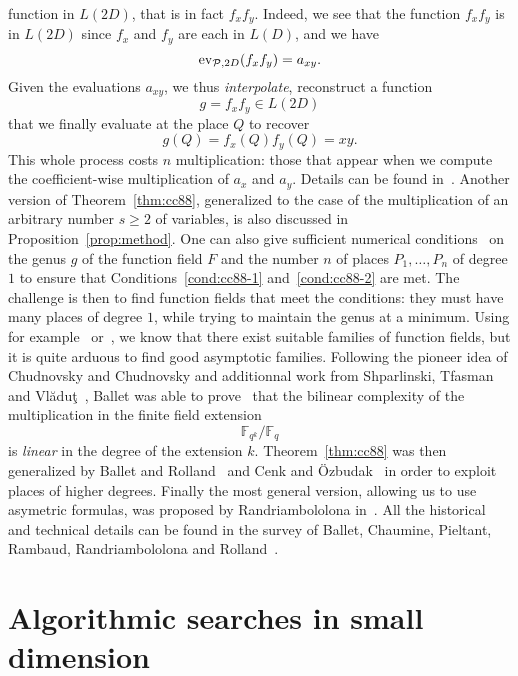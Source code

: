 function in $L(2D)$, that is in fact $f_xf_y$. Indeed, we see that the function
$f_xf_y$ is in $L(2D)$ since $f_x$ and $f_y$ are each in $L(D)$, and we have
\[
  \operatorname{ev}_{\mathcal{P}, 2D}(f_xf_y) = a_{xy}.
\]
Given the evaluations $a_{xy}$, we thus \emph{interpolate}, \ie reconstruct a
function
\[
  g = f_xf_y\in L(2D)
\]
that we finally evaluate at the place $Q$ to recover
\[
  g(Q) = f_x(Q)f_y(Q) = xy.
\]
This whole process costs $n$ multiplication: those that appear when we compute
the coefficient-wise multiplication of $a_x$ and $a_y$.
Details can be found in~\cite{CC88}. Another version of Theorem~\ref{thm:cc88},
generalized to the case of the multiplication of an arbitrary number $s\geq2$ of
variables, is also discussed in Proposition~\ref{prop:method}. One can also give
sufficient numerical conditions~\cite{Ballet98, Ballet99} on the genus $g$ of
the function field $F$ and the number
$n$ of places $P_1, \dots, P_n$ of degree $1$ to ensure that
Conditions~\ref{cond:cc88-1} and~\ref{cond:cc88-2} are met.
The challenge is
then to find function fields that meet the conditions: they must have many
places of degree $1$, while trying to maintain the genus at a minimum.
Using for example~\cite{STV92} or~\cite{Pieltant12}, we know that there exist
suitable families of function fields, but it is quite arduous to find good
asymptotic families. Following the pioneer idea of Chudnovsky and Chudnovsky and
additionnal work from Shparlinski, Tfasman and
Vlăduţ~\cite{STV92}, Ballet was able to prove~\cite{Ballet99} that the bilinear
complexity of the multiplication in the finite field extension
\[
  \mathbb{F}_{q^k}/\mathbb{F}_q
\]
is \emph{linear} in the degree of the extension $k$. Theorem~\ref{thm:cc88} was
then generalized by Ballet and Rolland~\cite{BR04} and Cenk and
Özbudak~\cite{CO10} in order to exploit places of higher degrees.
Finally the most general version, allowing us to use asymetric
formulas, was proposed by Randriambololona in~\cite{Randriam12}.
All the historical and technical details can be found in the survey of Ballet,
Chaumine, Pieltant, Rambaud, Randriambololona and Rolland~\cite{BCPRRR19}.

\section{Algorithmic searches in small dimension}

%


